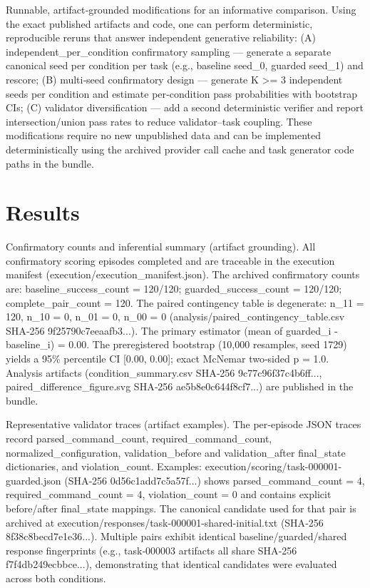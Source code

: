 \documentclass[conference]{IEEEtran}
\begin{document}
Runnable, artifact‑grounded modifications for an informative comparison. Using the exact published artifacts and code, one can perform deterministic, reproducible reruns that answer independent generative reliability: (A) independent\_per\_condition confirmatory sampling --- generate a separate canonical seed per condition per task (e.g., baseline seed\_0, guarded seed\_1) and rescore; (B) multi‑seed confirmatory design --- generate K >= 3 independent seeds per condition and estimate per‑condition pass probabilities with bootstrap CIs; (C) validator diversification --- add a second deterministic verifier and report intersection/union pass rates to reduce validator--task coupling. These modifications require no new unpublished data and can be implemented deterministically using the archived provider call cache and task generator code paths in the bundle.

\section{Results}
Confirmatory counts and inferential summary (artifact grounding). All confirmatory scoring episodes completed and are traceable in the execution manifest (execution/execution\_manifest.json). The archived confirmatory counts are: baseline\_success\_count = 120/120; guarded\_success\_count = 120/120; complete\_pair\_count = 120. The paired contingency table is degenerate: n\_11 = 120, n\_10 = 0, n\_01 = 0, n\_00 = 0 (analysis/paired\_contingency\_table.csv SHA‑256 9f25790c7eeaafb3...). The primary estimator (mean of guarded\_i - baseline\_i) = 0.00. The preregistered bootstrap (10,000 resamples, seed 1729) yields a 95\% percentile CI [0.00, 0.00]; exact McNemar two‑sided p = 1.0. Analysis artifacts (condition\_summary.csv SHA‑256 9c77c96f37c4b6ff..., paired\_difference\_figure.svg SHA‑256 ae5b8e0c644f8cf7...) are published in the bundle.

Representative validator traces (artifact examples). The per‑episode JSON traces record parsed\_command\_count, required\_command\_count, normalized\_configuration, validation\_before and validation\_after final\_state dictionaries, and violation\_count. Examples: execution/scoring/task-000001-guarded.json (SHA‑256 0d56c1add7c5a57f...) shows parsed\_command\_count = 4, required\_command\_count = 4, violation\_count = 0 and contains explicit before/after final\_state mappings. The canonical candidate used for that pair is archived at execution/responses/task-000001-shared-initial.txt (SHA‑256 8f38c8becd7e1e36...). Multiple pairs exhibit identical baseline/guarded/shared response fingerprints (e.g., task‑000003 artifacts all share SHA‑256 f7f4db249ecbbce...), demonstrating that identical candidates were evaluated across both conditions.
\end{document}
